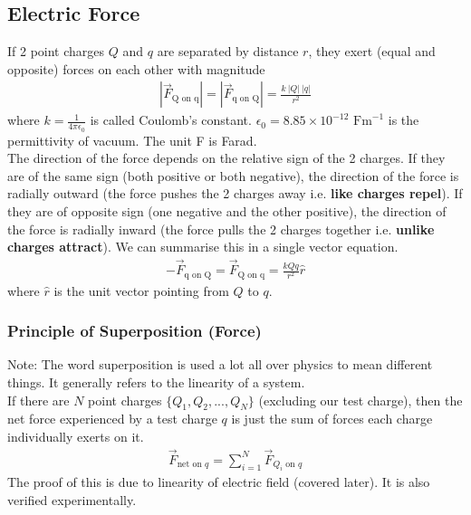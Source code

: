 \documentclass{article}
\begin{document}
\subsection{Electric Force}
If 2 point charges $Q$ and $q$ are separated by distance $r$, they exert (equal and opposite) forces on each other with magnitude 
\begin{align}
    | \vec{F}_{\text{Q on q}} | = | \vec{F}_{\text{q on Q}} | = \frac{k\ |Q|\ |q|}{r^2}
\end{align}
where $k = \frac{1}{4\pi\epsilon_0}$ is called Coulomb's constant. $\epsilon_0 = 8.85\times 10^{-12}\text{ Fm}^{-1}$ is the permittivity of vacuum. The unit F is Farad. \\[10pt]
The direction of the force depends on the relative sign of the 2 charges. If they are of the same sign (both positive or both negative), the direction of the force is radially outward (the force pushes the 2 charges away i.e. \textbf{like charges repel}). If they are of opposite sign (one negative and the other positive), the direction of the force is radially inward (the force pulls the 2 charges together i.e. \textbf{unlike charges attract}). We can summarise this in a single vector equation.
\begin{align}
    - \vec{F}_{\text{q on Q}} =\vec{F}_{\text{Q on q}} = \frac{kQq}{r^2} \hat{r} 
\end{align}
where $\hat{r}$ is the unit vector pointing from $Q$ to $q$.
\subsubsection{Principle of Superposition (Force)}
Note: The word superposition is used a lot all over physics to mean different things. It generally refers to the linearity of a system. \\[10pt]
If there are $N$ point charges $\{Q_1, Q_2, ..., Q_N\}$ (excluding our test charge), then the net force experienced by a test charge $q$ is just the sum of forces each charge individually exerts on it. 
\begin{align}
    \vec{F}_{\text{net on }q} = \sum_{i=1}^N \vec{F}_{Q_i \text{ on }q}
\end{align}
The proof of this is due to linearity of electric field (covered later). It is also verified experimentally.
\end{document}
